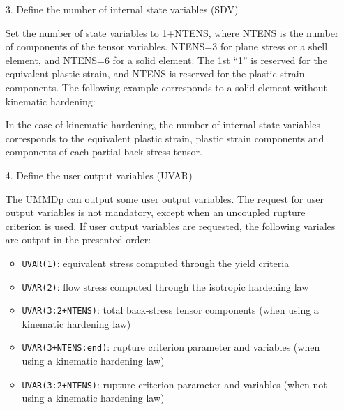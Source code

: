 \documentclass[11pt,a4paper,twoside,final,onecolumn,titlepage]{article}
\begin{document}
\begin{enumerate}
	\item[3.] Define the number of internal state variables (SDV)
	\item[] Set the number of state variables to 1+NTENS, where NTENS is the number of components of the tensor variables. NTENS=3 for plane stress or a shell element, and NTENS=6 for a solid element. The 1st “1” is reserved for the equivalent plastic strain, and NTENS is reserved for the plastic strain components. The following example corresponds to a solid element without kinematic hardening:\\
	\par
	\texttt{}
	\par\bigskip
	\item[] In the case of kinematic hardening, the number of internal state variables corresponds to the equivalent plastic strain, plastic strain components and components of each partial back-stress tensor.
	\par\bigskip
\end{enumerate}

\begin{enumerate}
	\item[4.] Define the user output variables (UVAR)
	\item[] The UMMDp can output some user output variables. The request for user output variables is not mandatory, except when an uncoupled rupture criterion is used. If user output variables are requested, the following variales are output in the presented order:
	\begin{itemize}
		\item \texttt{UVAR(1)}: equivalent stress computed through the yield criteria
		\item \texttt{UVAR(2)}: flow stress computed through the isotropic hardening law
		\item \texttt{UVAR(3:2+NTENS)}: total back-stress tensor components (when using a kinematic hardening law)
		\item \texttt{UVAR(3+NTENS:end)}: rupture criterion parameter and variables (when using a kinematic hardening law)
		\item \texttt{UVAR(3:2+NTENS)}: rupture criterion parameter and variables (when not using a kinematic hardening law)
	\end{itemize}
	\par\bigskip
	\texttt{}
	\par\bigskip
\end{enumerate}
\end{document}

